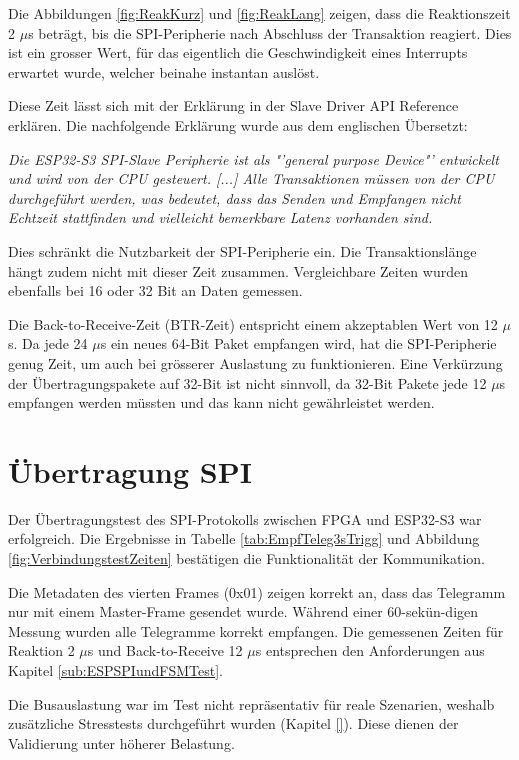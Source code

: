 Die Abbildungen \ref{fig:ReakKurz} und \ref{fig:ReakLang} zeigen, dass die Reaktionszeit 2 $\mu$s beträgt, bis die SPI-Peripherie nach Abschluss der Transaktion reagiert. Dies ist ein grosser Wert, für das eigentlich die Geschwindigkeit eines Interrupts erwartet wurde, welcher beinahe instantan auslöst.

Diese Zeit lässt sich mit der Erklärung in der Slave Driver API Reference erklären. Die nachfolgende Erklärung wurde aus dem englischen Übersetzt: 

\textit{Die ESP32-S3 SPI-Slave Peripherie ist als "'general purpose Device"' entwickelt und wird von der CPU gesteuert. [...] Alle Transaktionen müssen von der CPU durchgeführt werden, was bedeutet, dass das Senden und Empfangen nicht Echtzeit stattfinden und vielleicht bemerkbare Latenz vorhanden sind.}

Dies schränkt die Nutzbarkeit der SPI-Peripherie ein. Die Transaktionslänge hängt zudem nicht mit dieser Zeit zusammen. Vergleichbare Zeiten wurden ebenfalls bei 16 oder 32 Bit an Daten gemessen. 

Die Back-to-Receive-Zeit (BTR-Zeit) entspricht einem akzeptablen Wert von 12 $\mu$s. Da jede 24 $\mu$s ein neues 64-Bit Paket empfangen wird, hat die SPI-Peripherie genug Zeit, um auch bei grösserer Auslastung zu funktionieren. Eine Verkürzung der Übertragungspakete auf 32-Bit ist nicht sinnvoll, da 32-Bit Pakete jede 12 $\mu$s empfangen werden müssten und das kann nicht gewährleistet werden. 

\section{Übertragung SPI}
\label{sec:DiskussionÜbertragungSPI}

Der Übertragungstest des SPI-Protokolls zwischen FPGA und ESP32-S3 war erfolgreich. Die Ergebnisse in Tabelle \ref{tab:EmpfTeleg3sTrigg} und Abbildung \ref{fig:VerbindungstestZeiten} bestätigen die Funktionalität der Kommunikation.

Die Metadaten des vierten Frames (0x01) zeigen korrekt an, dass das Telegramm nur mit einem Master-Frame gesendet wurde. Während einer 60-sekün-digen Messung wurden alle Telegramme korrekt empfangen. Die gemessenen Zeiten für Reaktion 2 $\mu$s und Back-to-Receive 12 $\mu$s entsprechen den Anforderungen aus Kapitel \ref{sub:ESPSPIundFSMTest}.

Die Busauslastung war im Test nicht repräsentativ für reale Szenarien, weshalb zusätzliche Stresstests durchgeführt wurden (Kapitel \ref{}). Diese dienen der Validierung unter höherer Belastung.

